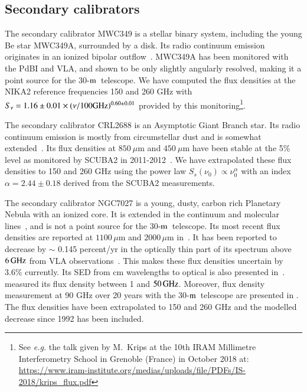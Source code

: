 \documentclass[traditionalabstract]{aa}
\newcommand{\trentemetre}{30-$\rm{m}$}
\newcommand{\lp}[1]{#1}
\begin{document}
\begin{appendix}
\subsection{Secondary calibrators}
\label{se:ref_flux_secondaries}


The secondary calibrator MWC349 is a stellar
binary system, including the young Be star MWC349A, surrounded by a
disk. Its radio continuum emission
originates in an ionized bipolar outflow~\citep{Tafoya2004}. MWC349A has
been monitored with the PdBI and VLA, and
shown to be %
only slightly angularly resolved,
making it a point source for the \trentemetre\ telescope.
We have computed the flux densities at the NIKA2 reference frequencies 150 and
260 GHz with $S_\nu = 1.16\pm0.01 \times
(\nu/100 \rm{GHz})^{0.60\pm0.01}$ provided by this
monitoring\footnote{See \emph{e.g.} the talk given by M.~Krips at the 10th 
IRAM Millimetre Interferometry School in Grenoble (France) in October
2018 at: 
\url{https://www.iram-institute.org/medias/uploads/file/PDFs/IS-2018/krips_flux.pdf}}.


The secondary calibrator CRL2688 is an Asymptotic Giant Branch
star. Its radio continuum emission is mostly from circumstellar dust
and is somewhat extended~\citep{Knapp1994}.  Its flux densities at
$850\ \mu$m and $450 \ \mu$m have been stable at the 5\% level as
monitored by SCUBA2 in 2011-2012~\citep{Dempsey2013_SCUBA2}.
We have extrapolated these flux densities to 150 and 260 GHz
using the power law $S_s(\nu_0) \propto \nu_0^{\alpha}$ with an index
$\alpha=2.44\pm0.18$ derived from the SCUBA2 measurements.


The secondary calibrator NGC7027 is a young, dusty, carbon rich
Planetary Nebula with an ionized core.  It is extended in the
continuum and molecular lines~\citep{Bieging1991}, and is not a point
source for the \trentemetre\ telescope.  Its most recent flux densities are
reported at $1100\, \mu$m and $2000\, \mu$m in~\citet{Hoare1992}. It has
been reported to decrease by $\sim$ 0.145 percent/yr in the optically
thin part of its spectrum above $6\,\rm{GHz}$ from VLA
observations~\citep{Zijlstra2008, Hafez2008}. This makes
these flux densities uncertain by 3.6\% currently. Its SED from cm
wavelengths to optical is also presented in~\citet{Hafez2008}. {\lp
\citet{Perley2013} measured its flux density between 1 and $50\,
\rm{GHz}$. Moreover, flux density measurement at 90 GHz over 20 years
with the \trentemetre\ telescope are presented in \citet{Kramer2008}.}
The flux densities have been extrapolated to 150 and 260 GHz and the
modelled decrease since 1992 has been included.


\end{appendix}
\end{document}
